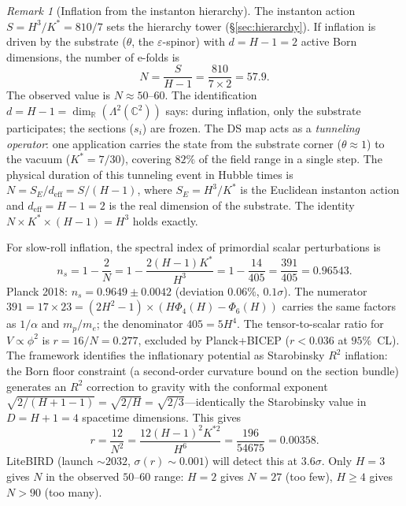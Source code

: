 \documentclass[11pt,a4paper]{article}
\theoremstyle{definition}
\theoremstyle{remark}
\newtheorem{remark}[theorem]{Remark}
\newcommand{\C}{\mathbb{C}}
\newcommand{\R}{\mathbb{R}}
\begin{document}
\begin{remark}[Inflation from the instanton hierarchy]\label{rem:inflation}
The instanton action $S=H^3/K^*=810/7$ sets the hierarchy tower (\S\ref{sec:hierarchy}). If inflation is driven by the substrate ($\theta$, the $\varepsilon$-spinor) with $d=H-1=2$ active Born dimensions, the number of e-folds is
\begin{equation}\label{eq:efolds}
N=\frac{S}{H-1}=\frac{810}{7\times 2}=57.9.
\end{equation}
The observed value is $N\approx 50$--$60$. The identification $d=H-1=\dim_\R(\Lambda^2(\C^2))$ says: during inflation, only the substrate participates; the sections ($s_i$) are frozen. The DS map acts as a \emph{tunneling operator}: one application carries the state from the substrate corner ($\theta\approx 1$) to the vacuum ($K^*=7/30$), covering $82\%$ of the field range in a single step. The physical duration of this tunneling event in Hubble times is $N=S_E/d_{\mathrm{eff}}=S/(H-1)$, where $S_E=H^3/K^*$ is the Euclidean instanton action and $d_{\mathrm{eff}}=H-1=2$ is the real dimension of the substrate. The identity $N\times K^*\times(H-1)=H^3$ holds exactly.

For slow-roll inflation, the spectral index of primordial scalar perturbations is
\begin{equation}\label{eq:spectral_index}
n_s = 1-\frac{2}{N} = 1-\frac{2(H-1)K^*}{H^3} = 1-\frac{14}{405} = \frac{391}{405} = 0.96543.
\end{equation}
Planck 2018: $n_s=0.9649\pm 0.0042$ (deviation $0.06\%$, $0.1\sigma$). The numerator $391=17\times 23=(2H^2-1)\times(H\Phi_4(H)-\Phi_6(H))$ carries the same factors as $1/\alpha$ and $m_p/m_e$; the denominator $405=5H^4$. The tensor-to-scalar ratio for $V\propto\phi^2$ is $r=16/N=0.277$, excluded by Planck+BICEP ($r<0.036$ at $95\%$~CL). The framework identifies the inflationary potential as Starobinsky $R^2$ inflation: the Born floor constraint (a second-order curvature bound on the section bundle) generates an $R^2$ correction to gravity with the conformal exponent $\sqrt{2/(H+1-1)}=\sqrt{2/H}=\sqrt{2/3}$---identically the Starobinsky value in $D=H+1=4$ spacetime dimensions. This gives
\begin{equation}\label{eq:tensor_scalar}
r=\frac{12}{N^2}=\frac{12(H-1)^2 K^{*2}}{H^6}=\frac{196}{54675}=0.00358.
\end{equation}
LiteBIRD (launch $\sim\!2032$, $\sigma(r)\sim 0.001$) will detect this at $3.6\sigma$. Only $H=3$ gives $N$ in the observed $50$--$60$ range: $H=2$ gives $N=27$ (too few), $H\geq 4$ gives $N>90$ (too many).
\end{remark}
\end{document}
